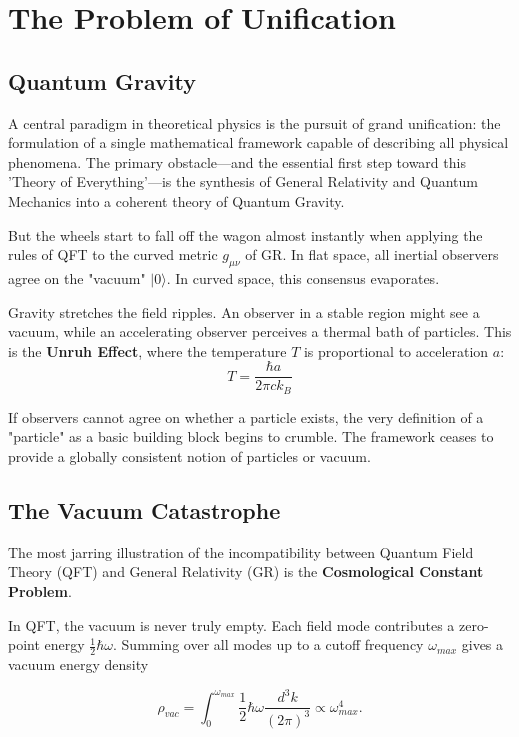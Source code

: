 \chapter{The Problem of Unification}
\label{chap:problem-of-unification}

\section{Quantum Gravity}

A central paradigm in theoretical physics is the pursuit of grand unification: the formulation of a single mathematical framework capable of describing all physical phenomena.
The primary obstacle—and the essential first step toward this 'Theory of Everything'—is the synthesis of General Relativity and Quantum Mechanics into a coherent theory of Quantum Gravity.

But the wheels start to fall off the wagon almost instantly when applying the rules of QFT to the curved metric $g_{\mu\nu}$ of GR. In flat space, all inertial observers agree on the "vacuum" $|0\rangle$. In curved space, this consensus evaporates. 

Gravity stretches the field ripples. An observer in a stable region might see a vacuum, while an accelerating observer perceives a thermal bath of particles. This is the \textbf{Unruh Effect}, where the temperature $T$ is proportional to acceleration $a$:
\[ T = \frac{\hbar a}{2\pi c k_B} \]

If observers cannot agree on whether a particle exists, the very definition of a "particle" as a basic building block begins to crumble.
The framework ceases to provide a globally consistent notion of particles or vacuum.


\section{The Vacuum Catastrophe}

The most jarring illustration of the incompatibility between Quantum Field Theory (QFT) and General Relativity (GR) is the \textbf{Cosmological Constant Problem}.  

In QFT, the vacuum is never truly empty. Each field mode contributes a zero-point energy $\frac{1}{2}\hbar \omega$. Summing over all modes up to a cutoff frequency $\omega_{max}$ gives a vacuum energy density

\[
\rho_{vac} = \int_{0}^{\omega_{max}} \frac{1}{2} \hbar \omega \frac{d^3k}{(2\pi)^3} \propto \omega_{max}^4 .
\]

